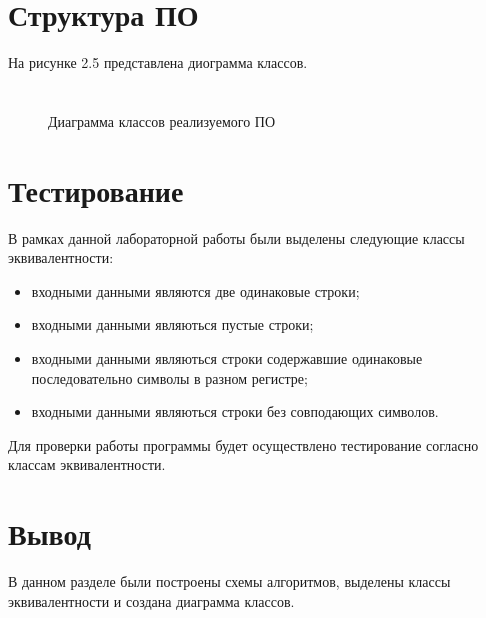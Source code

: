 \documentclass[12pt,a4paper]{report}
\begin{document}
\section{Структура ПО}

На рисунке 2.5 представлена диограмма классов.

\section*{}
\begin{figure}[ht]
	\caption{Диаграмма классов реализуемого ПО}
\end{figure}

\section{Тестирование}

В рамках данной лабораторной работы были выделены следующие классы эквивалентности:
\begin{itemize}
	\item входными данными являются две одинаковые строки;
	\item входными данными являються пустые строки;
	\item входными данными являються строки содержавшие одинаковые последовательно символы в разном регистре;
	\item входными данными являються строки без совподающих символов.
\end{itemize}

Для проверки работы программы будет осуществлено тестирование согласно классам эквивалентности.

\section*{Вывод}

В данном разделе были построены схемы алгоритмов, выделены классы эквивалентности и создана диаграмма классов.
\end{document}
